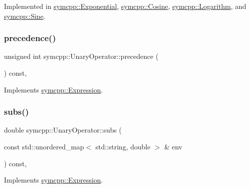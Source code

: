 Implemented in \mbox{\hyperlink{classsymcpp_1_1Exponential_a73f9208294626b48e2385a08e761b846}{symcpp\+::\+Exponential}}, \mbox{\hyperlink{classsymcpp_1_1Cosine_a92a24c87300b0e400f286b6ecc4eb1dd}{symcpp\+::\+Cosine}}, \mbox{\hyperlink{classsymcpp_1_1Logarithm_ab5cb1daed6613731d15ee13d17c48f7b}{symcpp\+::\+Logarithm}}, and \mbox{\hyperlink{classsymcpp_1_1Sine_ac7978c7094ce614049521c4d9cfd0827}{symcpp\+::\+Sine}}.

\mbox{\label{classsymcpp_1_1UnaryOperator_a129a9c47390abceff31da35d7b847329}} 
\subsubsection{\texorpdfstring{precedence()}{precedence()}}
{\footnotesize\ttfamily unsigned int symcpp\+::\+Unary\+Operator\+::precedence (\begin{DoxyParamCaption}{ }\end{DoxyParamCaption}) const\hspace{0.3cm}{\ttfamily [override]}, {\ttfamily [virtual]}}



Implements \mbox{\hyperlink{classsymcpp_1_1Expression_a181c162d5740faac392ffdca26bfca0c}{symcpp\+::\+Expression}}.

\mbox{\label{classsymcpp_1_1UnaryOperator_aa2296c73f9ca24a739fb8c3ff246fe0e}} 
\subsubsection{\texorpdfstring{subs()}{subs()}}
{\footnotesize\ttfamily double symcpp\+::\+Unary\+Operator\+::subs (\begin{DoxyParamCaption}\item[{const std\+::unordered\+\_\+map$<$ std\+::string, double $>$ \&}]{env }\end{DoxyParamCaption}) const\hspace{0.3cm}{\ttfamily [override]}, {\ttfamily [virtual]}}



Implements \mbox{\hyperlink{classsymcpp_1_1Expression_aaef29b0afa2d6c21fe35f47a1be76134}{symcpp\+::\+Expression}}.




